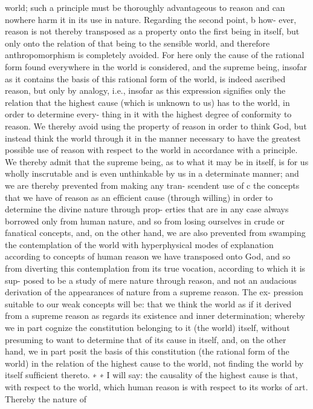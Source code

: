 world; such a principle must be thoroughly advantageous to reason and
can nowhere harm it in its use in nature. Regarding the second point, b how-
ever, reason is not thereby transposed as a property onto the ﬁrst being
in itself, but only onto the relation of that being to the sensible world, and
therefore anthropomorphism is completely avoided. For here only the
cause of the rational form found everywhere in the world is considered,
and the supreme being, insofar as it contains the basis of this rational
form of the world, is indeed ascribed reason, but only by analogy, i.e.,
insofar as this expression signiﬁes only the relation that the highest cause
(which is unknown to us) has to the world, in order to determine every-
thing in it with the highest degree of conformity to reason. We thereby
avoid using the property of reason in order to think God, but instead
think the world through it in the manner necessary to have the greatest
possible use of reason with respect to the world in accordance with a
principle. We thereby admit that the supreme being, as to what it may
be in itself, is for us wholly inscrutable and is even unthinkable by us in a
determinate manner; and we are thereby prevented from making any tran-
scendent use of c the concepts that we have of reason as an efﬁcient cause
(through willing) in order to determine the divine nature through prop-
erties that are in any case always borrowed only from human nature, and
so from losing ourselves in crude or fanatical concepts, and, on the other
hand, we are also prevented from swamping the contemplation of the
world with hyperphysical modes of explanation according to concepts
of human reason we have transposed onto God, and so from diverting
this contemplation from its true vocation, according to which it is sup-
posed to be a study of mere nature through reason, and not an audacious
derivation of the appearances of nature from a supreme reason. The ex-
pression suitable to our weak concepts will be: that we think the world
as if it derived from a supreme reason as regards its existence and inner
determination; whereby we in part cognize the constitution belonging
to it (the world) itself, without presuming to want to determine that of
its cause in itself, and, on the other hand, we in part posit the basis of this
constitution (the rational form of the world) in the relation of the highest
cause to the world, not ﬁnding the world by itself sufﬁcient thereto. ∗
∗
I will say: the causality of the highest cause is that, with respect to the world,
which human reason is with respect to its works of art. Thereby the nature of
